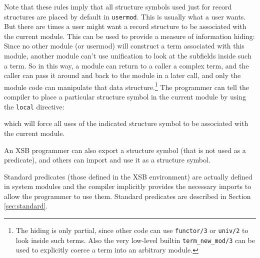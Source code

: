 Note that these rules imply that all structure symbols used just for
record structures are placed by default in {\tt usermod}.  This is
usually what a user wants.  But there are times a user might want a
record structure to be associated with the current module.  This can
be used to provide a measure of information hiding: Since no other
module (or usermod) will construct a term associated with this module,
another module can't use unification to look at the subfields inside
such a term.  So in this way, a module can return to a caller a
complex term, and the caller can pass it around and back to the module
in a later call, and only the module code can manipulate that data
structure.\footnote{The hiding is only partial, since other code can
  use {\tt functor/3} or {\tt univ/2} to look inside such terms.  Also
  the very low-level builtin {\tt term\_new\_mod/3} can be used to
  explicitly coerce a term into an arbitrary module.}  The programmer
can tell the compiler to place a particular structure symbol in the
current module by using the {\tt local} directive:


\noindent which will force all uses of the indicated structure symbol
to be associated with the current module.

An XSB programmer can also export a structure symbol (that is not used
as a predicate), and others can import and use it as a structure
symbol.

Standard predicates (those defined in the XSB environment) are
actually defined in system modules and the compiler implicitly
provides the necessary imports to allow the programmer to use them.
Standard predicates are described in Section \ref{sec:standard}.

